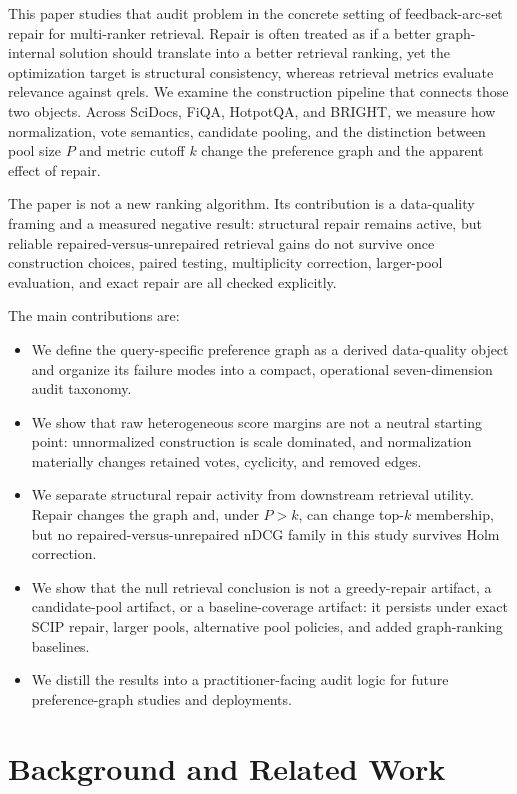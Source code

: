 \documentclass[acmsmall,anonymous,review]{acmart}
\begin{document}
This paper studies that audit problem in the concrete setting of
feedback-arc-set repair for multi-ranker retrieval. Repair is often treated
as if a better graph-internal solution should translate into a better
retrieval ranking, yet the optimization target is structural consistency,
whereas retrieval metrics evaluate relevance against qrels. We examine the
construction pipeline that connects those two objects. Across SciDocs,
FiQA, HotpotQA, and BRIGHT, we measure how normalization, vote semantics,
candidate pooling, and the distinction between pool size $P$ and metric
cutoff $k$ change the preference graph and the apparent effect of repair.

The paper is not a new ranking algorithm. Its contribution is a data-quality
framing and a measured negative result: structural repair remains active,
but reliable repaired-versus-unrepaired retrieval gains do not survive once
construction choices, paired testing, multiplicity correction, larger-pool
evaluation, and exact repair are all checked explicitly.

The main contributions are:

\begin{itemize}
  \item We define the query-specific preference graph as a derived
    data-quality object and organize its failure modes into a compact,
    operational seven-dimension audit taxonomy.
  \item We show that raw heterogeneous score margins are not a neutral
    starting point: unnormalized construction is scale dominated, and
    normalization materially changes retained votes, cyclicity, and removed
    edges.
  \item We separate structural repair activity from downstream retrieval
    utility. Repair changes the graph and, under $P>k$, can change top-$k$
    membership, but no repaired-versus-unrepaired nDCG family in this study
    survives Holm correction.
  \item We show that the null retrieval conclusion is not a greedy-repair
    artifact, a candidate-pool artifact, or a baseline-coverage artifact:
    it persists under exact SCIP repair, larger pools, alternative pool
    policies, and added graph-ranking baselines.
  \item We distill the results into a practitioner-facing audit logic for
    future preference-graph studies and deployments.
\end{itemize}

\section{Background and Related Work}
\label{sec:background}
\end{document}
